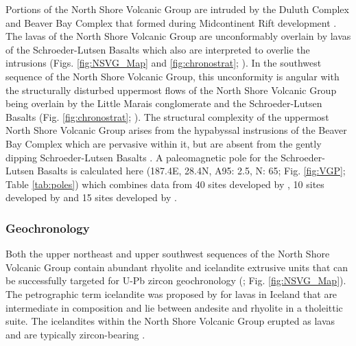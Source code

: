 \documentclass[11pt,letterpaper]{article}
\begin{document}
Portions of the North Shore Volcanic Group are intruded by the Duluth Complex and Beaver Bay Complex that formed during Midcontinent Rift development \citep{Miller2001a}. The lavas of the North Shore Volcanic Group are unconformably overlain by lavas of the Schroeder-Lutsen Basalts which also are interpreted to overlie the intrusions (Figs. \ref{fig:NSVG_Map} and \ref{fig:chronostrat}; \citealp{Green2011a, Fairchild2017a}). In the southwest sequence of the North Shore Volcanic Group, this unconformity is angular with the structurally disturbed uppermost flows of the North Shore Volcanic Group being overlain by the Little Marais conglomerate and the Schroeder-Lutsen Basalts (Fig. \ref{fig:chronostrat}; \citealp{Green2011a}). The structural complexity of the uppermost North Shore Volcanic Group arises from the hypabyssal instrusions of the Beaver Bay Complex which are pervasive within it, but are absent from the gently dipping Schroeder-Lutsen Basalts \citep{Miller2002b, Green2011a}. A paleomagnetic pole for the Schroeder-Lutsen Basalts is calculated here (187.4\textdegree E, 28.4\textdegree N, A95: 2.5\textdegree, N: 65; Fig. \ref{fig:VGP}; Table \ref{tab:poles}) which combines data from 40 sites developed by \cite{Fairchild2017a}, 10 sites developed by \cite{Tauxe2009a} and 15 sites developed by \cite{Books1972a}.

\subsubsection{Geochronology}

Both the upper northeast and upper southwest sequences of the North Shore Volcanic Group contain abundant rhyolite and icelandite extrusive units that can be successfully targeted for U-Pb zircon geochronology (\citealp{Davis1997a}; Fig. \ref{fig:NSVG_Map}). The petrographic term icelandite was proposed by \cite{Carmichael1964a} for lavas in Iceland that are intermediate in composition and lie between andesite and rhyolite in a tholeittic suite. The icelandites within the North Shore Volcanic Group erupted as lavas and are typically zircon-bearing \citep{Green1983a}.
\end{document}
